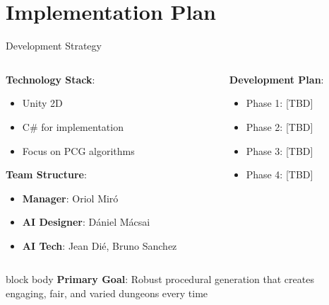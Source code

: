 \documentclass{beamer}
\begin{document}
\section{Implementation Plan}

\begin{frame}{Development Strategy}
    \begin{columns}[T]
        \begin{column}{0.48\textwidth}
            \textbf{Technology Stack}:
            \begin{itemize}
                \item \textcolor{ubburgundy}{Unity 2D}
                \item C\# for implementation
                \item Focus on PCG algorithms
            \end{itemize}

            \vspace{0.3cm}
            \textbf{Team Structure}:
            \begin{itemize}
                \item \textbf{Manager}: Oriol Miró
                \item \textbf{AI Designer}: Dániel Mácsai
                \item \textbf{AI Tech}: Jean Dié, Bruno Sanchez
            \end{itemize}
        \end{column}

        \begin{column}{0.48\textwidth}
            \textbf{Development Plan}:
            \begin{itemize}
                \item Phase 1: [TBD]
                \item Phase 2: [TBD]
                \item Phase 3: [TBD]
                \item Phase 4: [TBD]
            \end{itemize}
        \end{column}
    \end{columns}

    \vspace{0.4cm}
    \begin{beamercolorbox}[rounded=true,shadow=true,wd=\textwidth,center]{block body}
        \textbf{Primary Goal}: Robust procedural generation that creates\\
        engaging, fair, and varied dungeons every time
    \end{beamercolorbox}
\end{frame}
\end{document}
